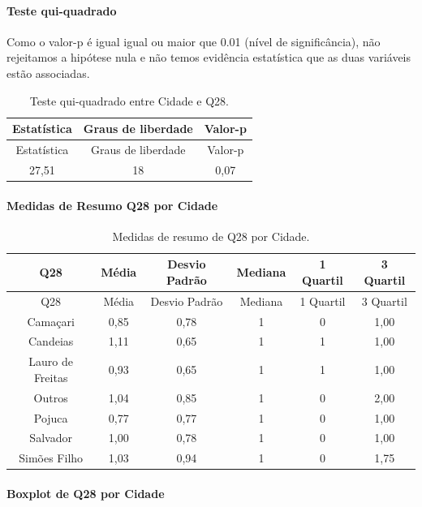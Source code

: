 \documentclass[]{article}
\let\oldparagraph\paragraph
\renewcommand{\paragraph}[1]{\oldparagraph{#1}\mbox{}}
\begin{document}
\hypertarget{teste-qui-quadrado-72}{%
\paragraph{Teste qui-quadrado}\label{teste-qui-quadrado-72}}

Como o valor-p é igual igual ou maior que 0.01 (nível de significância), não rejeitamos a hipótese nula e não temos evidência estatística que as duas variáveis estão associadas.

\begin{longtable}[]{@{}ccc@{}}
\caption{\label{tab:unnamed-chunk-842}Teste qui-quadrado entre Cidade e Q28.}\tabularnewline
\toprule
Estatística & Graus de liberdade & Valor-p\tabularnewline
\midrule
\endfirsthead
\toprule
Estatística & Graus de liberdade & Valor-p\tabularnewline
\midrule
\endhead
27,51 & 18 & 0,07\tabularnewline
\bottomrule
\end{longtable}

\cleardoublepage

\hypertarget{medidas-de-resumo-q28-por-cidade}{%
\paragraph{Medidas de Resumo Q28 por Cidade}\label{medidas-de-resumo-q28-por-cidade}}

\begin{longtable}[]{@{}cccccc@{}}
\caption{\label{tab:unnamed-chunk-843}Medidas de resumo de Q28 por Cidade.}\tabularnewline
\toprule
Q28 & Média & Desvio Padrão & Mediana & 1 Quartil & 3 Quartil\tabularnewline
\midrule
\endfirsthead
\toprule
Q28 & Média & Desvio Padrão & Mediana & 1 Quartil & 3 Quartil\tabularnewline
\midrule
\endhead
Camaçari & 0,85 & 0,78 & 1 & 0 & 1,00\tabularnewline
Candeias & 1,11 & 0,65 & 1 & 1 & 1,00\tabularnewline
Lauro de Freitas & 0,93 & 0,65 & 1 & 1 & 1,00\tabularnewline
Outros & 1,04 & 0,85 & 1 & 0 & 2,00\tabularnewline
Pojuca & 0,77 & 0,77 & 1 & 0 & 1,00\tabularnewline
Salvador & 1,00 & 0,78 & 1 & 0 & 1,00\tabularnewline
Simões Filho & 1,03 & 0,94 & 1 & 0 & 1,75\tabularnewline
\bottomrule
\end{longtable}

\hypertarget{boxplot-de-q28-por-cidade}{%
\paragraph{Boxplot de Q28 por Cidade}\label{boxplot-de-q28-por-cidade}}
\end{document}
